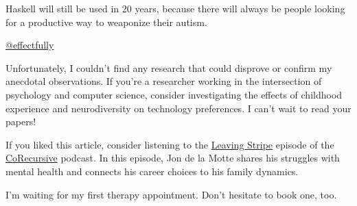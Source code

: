 \documentclass{article}
\begin{document}
\epigraph{
  Haskell will still be used in 20 years,
  because there will always be people looking for a productive way to weaponize their autism.
}{\href{https://x.com/effectfully/status/1901124439258894769}{@effectfully}}

Unfortunately, I couldn't find any research that could disprove or confirm my anecdotal observations.
If you're a researcher working in the intersection of psychology and computer science, consider investigating the effects of childhood experience and neurodiversity on technology preferences.
I can't wait to read your papers!

If you liked this article,
consider listening to the \href{https://corecursive.com/leaving-stripe-with-jon-de-le-motte/}{Leaving Stripe} episode of the \href{https://corecursive.com/}{CoRecursive} podcast.
In this episode, Jon de la Motte shares his struggles with mental health and connects his career choices to his family dynamics.

I'm waiting for my first therapy appointment.
Don't hesitate to book one, too.
\end{document}
